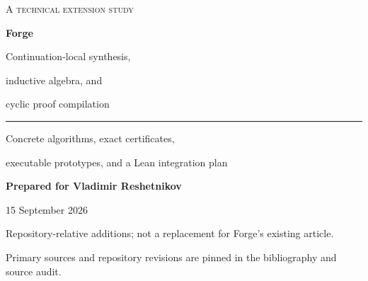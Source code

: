\documentclass[11pt,a4paper]{article}
\theoremstyle{definition}\newtheorem{definition}[theorem]{Definition}
\theoremstyle{remark}\newtheorem{remark}[theorem]{Remark}
\begin{document}
\begin{titlepage}
\vspace*{13mm}
{\color{oliveink}\large\scshape A technical extension study}\par
\vspace{9mm}
{\fontsize{31}{35}\selectfont\bfseries Forge}\par
\vspace{4mm}
{\fontsize{19}{24}\selectfont Continuation-local synthesis,\par inductive algebra, and\par cyclic proof compilation}\par
\vspace{7mm}
{\color{oliveink}\rule{\textwidth}{.8pt}}\par
\vspace{4mm}
{\large Concrete algorithms, exact certificates,\par executable prototypes, and a Lean integration plan}\par
\vspace{12mm}
\textbf{Prepared for Vladimir Reshetnikov}\par
15 September 2026\par
\vspace{8mm}
\begin{abstract}
Forge already has a substantial design for orchestration, proof acceptance,
arithmetic witnesses, induction planning, and certificate-producing backends.
The useful next step is not another orchestration layer. It is a set of workers
that construct proof structure which the existing workers do not yet construct.

This article develops three such extensions. Continuation-local synthesis derives
fold algebras from residual specifications and searches their holes separately,
with an explicit treatment of correlations. Inductive algebra combines a fast
pullback-stable vector-space algorithm with target-seeded ideal completion,
which can discover mutually supporting polynomial equations and generate exact
orbit counterexamples. Cyclic proof compilation treats a recursive obligation
graph as a candidate for ordinary well-founded induction, using synthesized
phase-sensitive or lexicographic rankings rather than accepting a circular proof.

The archive contains runnable Python implementations, an independent exact
replayer, 135 replayed encoded certificates, 31 rejected corruptions, and detailed
experimental records. The results establish the specified finite-fragment
algorithms, not an end-to-end Lean tactic. Lean bridge code and proof specimens
are explicitly separated from executed work.
\end{abstract}
\vfill
{\small\color{quiet}Repository-relative additions; not a replacement for Forge's existing article.\par
Primary sources and repository revisions are pinned in the bibliography and source audit.}
\end{titlepage}
\end{document}
